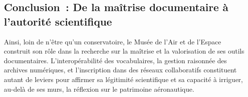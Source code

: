 \subsection{Conclusion : De la maîtrise documentaire à l’autorité scientifique}

Ainsi, loin de n’être qu’un conservatoire, le Musée de l’Air et de l’Espace construit son rôle dans la recherche sur la maîtrise et la valorisation de ses outils documentaires. L’interopérabilité des vocabulaires, la gestion raisonnée des archives numériques, et l’inscription dans des réseaux collaboratifs constituent autant de leviers pour affirmer sa légitimité scientifique et sa capacité à irriguer, au-delà de ses murs, la réflexion sur le patrimoine aéronautique.
